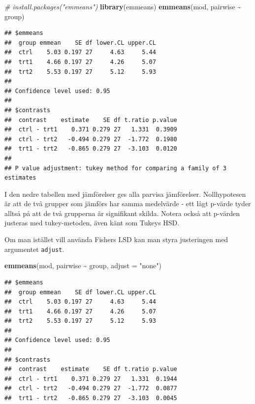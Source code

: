 \documentclass[
]{book}
\newenvironment{Shaded}{\begin{snugshade}}{\end{snugshade}}
\newcommand{\AttributeTok}[1]{\textcolor[rgb]{0.13,0.29,0.53}{#1}}
\newcommand{\CommentTok}[1]{\textcolor[rgb]{0.56,0.35,0.01}{\textit{#1}}}
\newcommand{\FunctionTok}[1]{\textcolor[rgb]{0.13,0.29,0.53}{\textbf{#1}}}
\newcommand{\NormalTok}[1]{#1}
\newcommand{\SpecialCharTok}[1]{\textcolor[rgb]{0.81,0.36,0.00}{\textbf{#1}}}
\newcommand{\StringTok}[1]{\textcolor[rgb]{0.31,0.60,0.02}{#1}}
\theoremstyle{definition}
\theoremstyle{definition}
\theoremstyle{definition}
\theoremstyle{definition}
\theoremstyle{remark}
\begin{document}
\begin{Shaded}
\begin{Highlighting}[]
\CommentTok{\# install.packages("emmeans")}
\FunctionTok{library}\NormalTok{(emmeans)}
\FunctionTok{emmeans}\NormalTok{(mod, pairwise }\SpecialCharTok{\textasciitilde{}}\NormalTok{ group)}
\end{Highlighting}
\end{Shaded}

\begin{verbatim}
## $emmeans
##  group emmean    SE df lower.CL upper.CL
##  ctrl    5.03 0.197 27     4.63     5.44
##  trt1    4.66 0.197 27     4.26     5.07
##  trt2    5.53 0.197 27     5.12     5.93
## 
## Confidence level used: 0.95 
## 
## $contrasts
##  contrast    estimate    SE df t.ratio p.value
##  ctrl - trt1    0.371 0.279 27   1.331  0.3909
##  ctrl - trt2   -0.494 0.279 27  -1.772  0.1980
##  trt1 - trt2   -0.865 0.279 27  -3.103  0.0120
## 
## P value adjustment: tukey method for comparing a family of 3 estimates
\end{verbatim}

I den nedre tabellen med jämförelser ges alla parvisa jämförelser. Nollhypotesen är att de två grupper som jämförs har samma medelvärde - ett lågt p-värde tyder alltså på att de två grupperna är signifikant skilda. Notera också att p-värden justeras med tukey-metoden, även känt som Tukeys HSD.

Om man istället vill använda Fishers LSD kan man styra justeringen med argumentet \texttt{adjust}.

\begin{Shaded}
\begin{Highlighting}[]
\FunctionTok{emmeans}\NormalTok{(mod, pairwise }\SpecialCharTok{\textasciitilde{}}\NormalTok{ group, }\AttributeTok{adjust =} \StringTok{"none"}\NormalTok{)}
\end{Highlighting}
\end{Shaded}

\begin{verbatim}
## $emmeans
##  group emmean    SE df lower.CL upper.CL
##  ctrl    5.03 0.197 27     4.63     5.44
##  trt1    4.66 0.197 27     4.26     5.07
##  trt2    5.53 0.197 27     5.12     5.93
## 
## Confidence level used: 0.95 
## 
## $contrasts
##  contrast    estimate    SE df t.ratio p.value
##  ctrl - trt1    0.371 0.279 27   1.331  0.1944
##  ctrl - trt2   -0.494 0.279 27  -1.772  0.0877
##  trt1 - trt2   -0.865 0.279 27  -3.103  0.0045
\end{verbatim}
\end{document}
